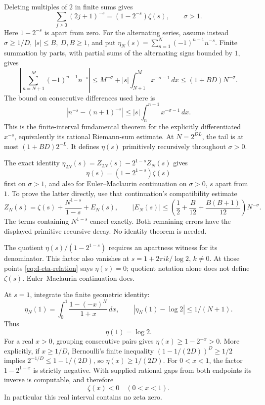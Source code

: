 Deleting multiples of \(2\) in finite sums gives
\[
 \sum_{j\geq0}(2j+1)^{-s}=(1-2^{-s})\zeta(s),
              \qquad \sigma>1.                       \tag{D16}\label{eq:d-odd}
\]
Here \(1-2^{-s}\) is apart from zero.
For the alternating series, assume instead
\(\sigma\geq1/D,\ |s|\leq B,\ D,B\geq1\), and put
\(\eta_N(s)=\sum_{n=1}^N(-1)^{n-1}n^{-s}\).
Finite summation by parts, with partial sums of the alternating signs
bounded by \(1\), gives
\[
 \left|\sum_{n=N+1}^M(-1)^{n-1}n^{-s}\right|
 \leq M^{-\sigma}+|s|\int_{N+1}^{M}x^{-\sigma-1}\,dx
 \leq(1+BD)N^{-\sigma}.                               \tag{D17}\label{eq:d-eta-tail}
\]
The bound on consecutive differences used here is
\[
 |n^{-s}-(n+1)^{-s}|
     \leq |s|\int_n^{n+1}x^{-\sigma-1}\,dx.
\]
This is the finite-interval fundamental theorem for the explicitly
differentiated \(x^{-s}\), equivalently its rational Riemann-sum
estimate. At \(N=2^{DL}\), the tail is at most \((1+BD)2^{-L}\).
It defines \(\eta(s)\) primitively recursively throughout \(\sigma>0\).

The exact identity
\(\eta_{2N}(s)=Z_{2N}(s)-2^{1-s}Z_N(s)\) gives
\[
                       \eta(s)=(1-2^{1-s})\zeta(s)    \tag{D18}\label{eq:d-eta-relation}
\]
first on \(\sigma>1\), and also for Euler--Maclaurin continuation on
\(\sigma>0\), \(s\) apart from \(1\). To prove the latter directly, use
that continuation's compatibility estimate
\[
 Z_N(s)=\zeta(s)+\frac{N^{1-s}}{1-s}+E_N(s),\qquad
 |E_N(s)|\leq
 \left(\frac12+\frac B{12}+\frac{B(B+1)}{12}\right)N^{-\sigma}.
                                                               \tag{D19}\label{eq:d-eta-em}
\]
The terms containing \(N^{1-s}\) cancel exactly. Both remaining errors
have the displayed primitive recursive decay.
No identity theorem is needed.

The quotient \(\eta(s)/(1-2^{1-s})\) requires an apartness witness for
its denominator. This factor also vanishes at
\(s=1+2\pi i k/\log2\), \(k\ne0\). At those points
\eqref{eq:d-eta-relation} says \(\eta(s)=0\); quotient notation alone
does not define \(\zeta(s)\). Euler--Maclaurin continuation does.

At \(s=1\), integrate the finite geometric identity:
\[
 \eta_N(1)=\int_0^1\frac{1-(-x)^N}{1+x}\,dx,\qquad
 |\eta_N(1)-\log2|\leq1/(N+1).
\]
Thus
\[
                              \eta(1)=\log2.          \tag{D20}\label{eq:d-eta-one}
\]
For a real \(x>0\), grouping consecutive pairs gives
\(\eta(x)\geq1-2^{-x}>0\).
More explicitly, if \(x\geq1/D\), Bernoulli's finite inequality
\((1-1/(2D))^D\geq1/2\) implies
\(2^{-1/D}\leq1-1/(2D)\), so \(\eta(x)\geq1/(2D)\).
For \(0<x<1\), the factor \(1-2^{1-x}\) is strictly negative.
With supplied rational gaps from both endpoints its inverse is
computable, and therefore
\[
                         \zeta(x)<0\quad(0<x<1).      \tag{D21}\label{eq:d-real-negative}
\]
In particular this real interval contains no zeta zero.


